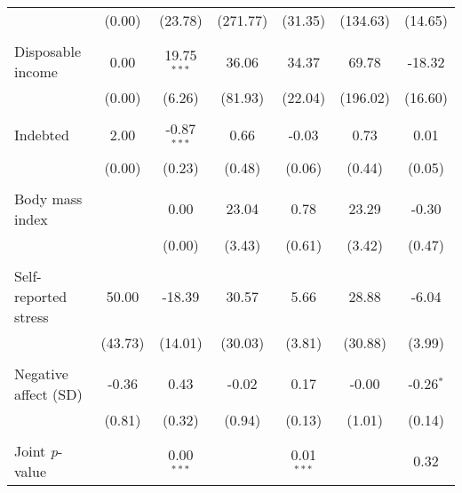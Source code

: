 {\begin{tabular}{l*{6}{c}}
          &   (0.00)&  (23.78)& (271.77)&  (31.35)& (134.63)&  (14.65)\\
          &         &         &         &         &         &         \\
Disposable income&     0.00&19.75$^{***}$&    36.06&    34.37&    69.78&   -18.32\\
          &   (0.00)&   (6.26)&  (81.93)&  (22.04)& (196.02)&  (16.60)\\
          &         &         &         &         &         &         \\
Indebted  &     2.00&-0.87$^{***}$&     0.66&    -0.03&     0.73&     0.01\\
          &   (0.00)&   (0.23)&   (0.48)&   (0.06)&   (0.44)&   (0.05)\\
          &         &         &         &         &         &         \\
Body mass index&         &     0.00&    23.04&     0.78&    23.29&    -0.30\\
          &         &   (0.00)&   (3.43)&   (0.61)&   (3.42)&   (0.47)\\
          &         &         &         &         &         &         \\
Self-reported stress&    50.00&   -18.39&    30.57&     5.66&    28.88&    -6.04\\
          &  (43.73)&  (14.01)&  (30.03)&   (3.81)&  (30.88)&   (3.99)\\
          &         &         &         &         &         &         \\
Negative affect (SD)&    -0.36&     0.43&    -0.02&     0.17&    -0.00&-0.26$^{*}$\\
          &   (0.81)&   (0.32)&   (0.94)&   (0.13)&   (1.01)&   (0.14)\\
          &         &         &         &         &         &         \\
\midrule Joint \emph{p}-value&         &0.00$^{***}$&         &0.01$^{***}$&         &     0.32\\
\bottomrule
\end{tabular}
}
